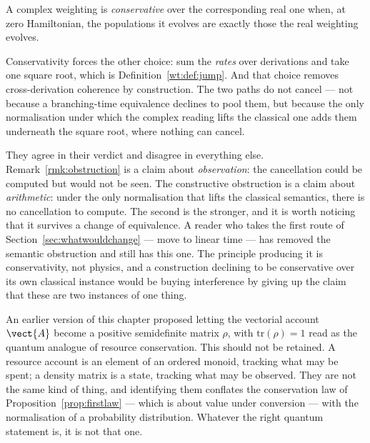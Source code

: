 \begin{definition}[Conservativity]
\label{def:conservativity}
A complex weighting is \emph{conservative} over the corresponding real one
when, at zero Hamiltonian, the populations it evolves are exactly those
the real weighting evolves.
\end{definition}

Conservativity forces the other choice: sum the \emph{rates} over
derivations and take one square root, which is
Definition~\ref{wt:def:jump}.  And that choice removes cross-derivation
coherence by construction.  The two paths do not cancel --- not because a
branching-time equivalence declines to pool them, but because the only
normalisation under which the complex reading lifts the classical one adds
them underneath the square root, where nothing can cancel.

\begin{remark}
\label{rmk:two-obstructions}
They agree in their verdict and disagree in everything else.
Remark~\ref{rmk:obstruction} is a claim about \emph{observation}: the
cancellation could be computed but would not be seen.  The constructive
obstruction is a claim about \emph{arithmetic}: under the only
normalisation that lifts the classical semantics, there is no cancellation
to compute.  The second is the stronger, and it is worth noticing that it
survives a change of equivalence.  A reader who takes the first route of
Section~\ref{sec:whatwouldchange} --- move to linear time --- has removed
the semantic obstruction and still has this one.  The principle producing
it is conservativity, not physics, and a construction declining to be
conservative over its own classical instance would be buying interference
by giving up the claim that these are two instances of one thing.
\end{remark}

\begin{remark}
An earlier version of this chapter proposed letting the vectorial account
$\vect{A}$ become a positive semidefinite matrix $\rho$, with
$\mathrm{tr}(\rho)=1$ read as the quantum analogue of resource
conservation.  This should not be retained.  A resource account is an
element of an ordered monoid, tracking what may be spent; a density matrix
is a state, tracking what may be observed.  They are not the same kind of
thing, and identifying them conflates the conservation law of
Proposition~\ref{prop:firstlaw} --- which is about value under conversion
--- with the normalisation of a probability distribution.  Whatever the
right quantum statement is, it is not that one.
\end{remark}

